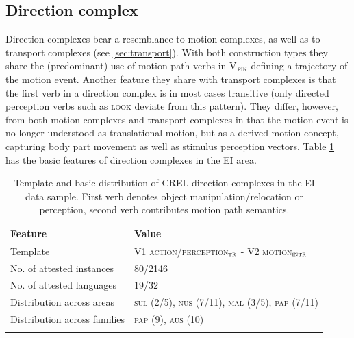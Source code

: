 \subsection{Direction complex} \label{sec:direction}
Direction complexes bear a resemblance to motion complexes, as well as to transport complexes (see \ref{sec:transport}). With both construction types they share the (predominant) use of motion path verbs in V$_{\textsc{fin}}$ defining a trajectory of the motion event. Another feature they share with transport complexes is that the first verb in a direction complex is in most cases transitive (only directed perception verbs such as \textsc{look} deviate from this pattern). They differ, however, from both motion complexes and transport complexes in that the motion event is no longer understood as translational motion, but as a derived motion concept, capturing body part movement as well as stimulus perception vectors. Table \ref{table:basiccreldir} has the basic features of direction complexes in the EI area.

\begin{table}
\begin{tabular}{ll}
\lsptoprule
Feature&Value\tabularnewline
\midrule
Template&V1 \textsc{action/perception$_{\textsc{tr}}$} - V2 \textsc{motion$_\textsc{intr}$}\tabularnewline
No. of attested instances& 80/2146 \tabularnewline
No. of attested languages& 19/32 \tabularnewline
Distribution across areas& \textsc{sul} (2/5), \textsc{nus} (7/11), \textsc{mal} (3/5), \textsc{pap} (7/11) \tabularnewline
Distribution across families& \textsc{pap} (9), \textsc{aus} (10) \tabularnewline
\lspbottomrule
\end{tabular}
\caption[Template and basic distribution of CREL direction complexes]{Template and basic distribution of CREL direction complexes in the EI data sample. First verb denotes object manipulation/relocation or perception, second verb contributes motion path semantics.}
\label{table:basiccreldir}
\end{table}


